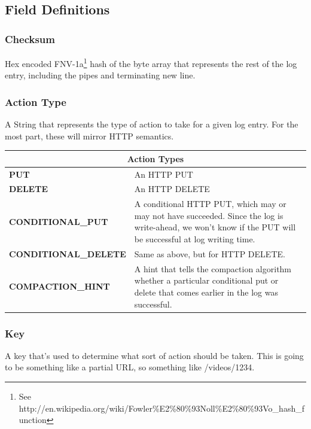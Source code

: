 \documentclass[11pt]{article}
\begin{document}
\subsection{Field Definitions}

\subsubsection{Checksum}
Hex encoded FNV-1a\footnote{See http://en.wikipedia.org/wiki/Fowler\%E2\%80\%93Noll\%E2\%80\%93Vo\_hash\_function} hash of the byte array that represents the rest of the log entry, including the pipes and terminating new line.

\subsubsection{Action Type}
A String that represents the type of action to take for a given log entry.  For the most part, these will mirror HTTP semantics.

\begin{center}
\begin{tabular}{|l|p{3.5in}|}
\hline
\multicolumn{2}{|c|}{Action  Types}\\ \hline
\textbf{PUT} & An HTTP PUT\\ \hline
\textbf{DELETE} & An HTTP DELETE\\ \hline
\textbf{CONDITIONAL\_PUT} & A conditional HTTP PUT, which may or may not have succeeded.   Since the log is write-ahead, we won’t know if the PUT will be successful at log writing time.\\ \hline
\textbf{CONDITIONAL\_DELETE} & Same as above, but for HTTP DELETE.\\ \hline
\textbf{COMPACTION\_HINT} & A hint that tells the compaction algorithm whether a particular conditional put or delete that comes earlier in the log was successful.\\ \hline
\end{tabular}
\end{center}

\subsubsection{Key}
A key that’s used to determine what sort of action should be taken.  This is going to be something like a partial URL, so something like /videos/1234.
\end{document}
